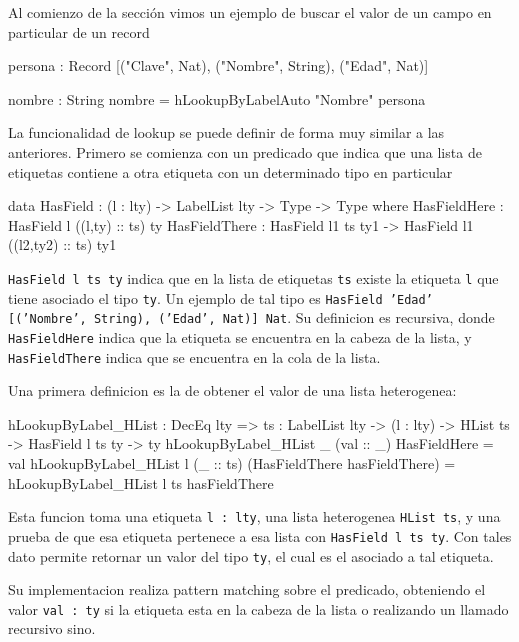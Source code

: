 Al comienzo de la sección vimos un ejemplo de buscar el valor de un campo en particular de un record

\begin{code}
persona : Record [("Clave", Nat), ("Nombre", String), 
  ("Edad", Nat)]

nombre : String
nombre = hLookupByLabelAuto "Nombre" persona
\end{code}

La funcionalidad de lookup se puede definir de forma muy similar a las anteriores. Primero se comienza con un predicado que indica que una lista de etiquetas contiene a otra etiqueta con un determinado tipo en particular

\begin{code}
data HasField : (l : lty) -> LabelList lty -> 
  Type -> Type where
  HasFieldHere : HasField l ((l,ty) :: ts) ty
  HasFieldThere : HasField l1 ts ty1 -> 
    HasField l1 ((l2,ty2) :: ts) ty1
\end{code}

\texttt{HasField l ts ty} indica que en la lista de etiquetas \texttt{ts} existe la etiqueta \texttt{l} que tiene asociado el tipo \texttt{ty}. Un ejemplo de tal tipo es \texttt{HasField 'Edad' [('Nombre', String), ('Edad', Nat)] Nat}. Su definicion es recursiva, donde \texttt{HasFieldHere} indica que la etiqueta se encuentra en la cabeza de la lista, y \texttt{HasFieldThere} indica que se encuentra en la cola de la lista.

Una primera definicion es la de obtener el valor de una lista heterogenea:

\begin{code}
hLookupByLabel_HList : DecEq lty => {ts : LabelList lty} -> 
  (l : lty) -> HList ts -> HasField l ts ty -> ty
hLookupByLabel_HList _ (val :: _) HasFieldHere = val
hLookupByLabel_HList l (_ :: ts) 
  (HasFieldThere hasFieldThere) = 
  hLookupByLabel_HList l ts hasFieldThere
\end{code}

Esta funcion toma una etiqueta \texttt{l : lty}, una lista heterogenea \texttt{HList ts}, y una prueba de que esa etiqueta pertenece a esa lista con \texttt{HasField l ts ty}. Con tales dato permite retornar un valor del tipo \texttt{ty}, el cual es el asociado a tal etiqueta.

Su implementacion realiza pattern matching sobre el predicado, obteniendo el valor \texttt{val : ty} si la etiqueta esta en la cabeza de la lista o realizando un llamado recursivo sino.


